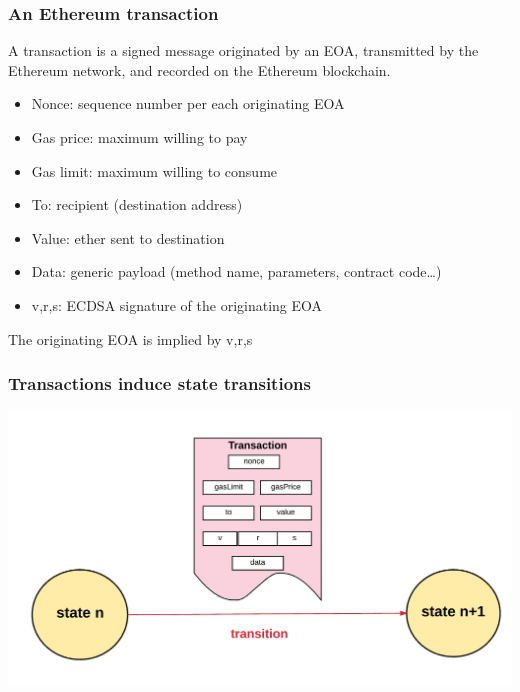 \documentclass[11pt]{beamer}  %
\begin{document}
\begin{frame}\frametitle{An Ethereum transaction}

  \begin{greenbox}{}
    A transaction is a signed message originated by an EOA, transmitted
    by the Ethereum network, and recorded on the Ethereum blockchain.
    \begin{itemize}
    \item Nonce: sequence number per each originating EOA
    \item Gas price: maximum willing to pay
    \item Gas limit: maximum willing to consume
    \item To: recipient (destination address)
    \item Value: ether sent to destination
    \item Data: generic payload (method name, parameters, contract code\ldots)
    \item v,r,s: ECDSA signature of the originating EOA
    \end{itemize}
  \end{greenbox}

  \begin{center}
    The originating EOA is implied by v,r,s
  \end{center}

\end{frame}

\begin{frame}\frametitle{Transactions induce state transitions}

  \begin{center}
    \includegraphics[width=\textwidth,clip=false]{pictures/state-transition.png}
  \end{center}

\end{frame}
\end{document}
